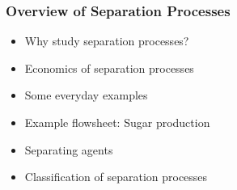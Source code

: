 

\begin{frame}\frametitle{Overview of Separation Processes}

	\begin{itemize}
		\item	Why study separation processes?
		\item	Economics of separation processes
		\item	Some everyday examples
		\item	Example flowsheet: Sugar production
		\item	Separating agents
		\item	Classification of separation processes
	\end{itemize}
\end{frame}



